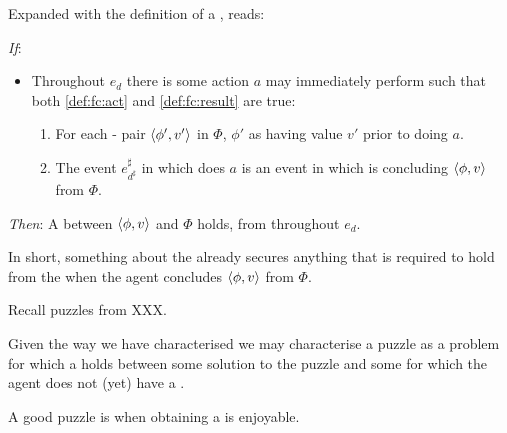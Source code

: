 \begin{note}
  \noindent%
  Expanded with the definition of a \fc{}, \supportII{} reads:
  \begin{itenum}
  \item[\emph{If}:]
    \begin{itemize}
    \item
      Throughout \(e_{d}\) there is some action \(a\) \vAgent{} may immediately perform such that both \ref{def:fc:act} and \ref{def:fc:result} are true:
      \begin{enumerate}[label=\alph*., ref=(\alph*)]
      \item
        For each - pair \(\langle \phi', v' \rangle\) in \(\Phi\), \vAgent{} \evals{} \(\phi'\) as having value \(v'\) prior to doing \(a\).
      \item
        The event \(e^{\sharp}_{d^{\sharp}}\) in which \vAgent{} does \(a\) is an event in which \vAgent{} is concluding \(\langle \phi, v \rangle\) from \(\Phi\).
      \end{enumerate}
    \end{itemize}
  \item[\emph{Then}:]
    A \ros{} between \(\langle \phi, v \rangle\) and \(\Phi\) holds, from  throughout \(e_{d}\).
  \end{itenum}

  \noindent%
  In short, something about the  already secures anything that is required to hold from the \agpe{} when the agent concludes \(\langle \phi, v \rangle\) from \(\Phi\).
\end{note}


\begin{note}
  Recall puzzles from XXX.

  Given the way we have characterised \ros{} we may characterise a puzzle as a problem for which a \ros{} holds between some solution to the puzzle and some \pool{} for which the agent does not (yet) have a \wit{}.

  A good puzzle is when obtaining a \wit{} is enjoyable.
\end{note}


